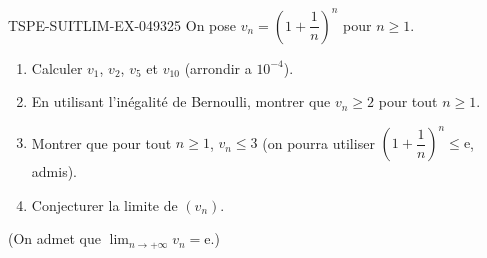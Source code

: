 \begin{exercice}{TSPE-SUITLIM-EX-049}{3}{25}
On pose $v_n = \left(1 + \dfrac{1}{n}\right)^n$ pour $n \geq 1$.
\begin{enumerate}
  \item Calculer $v_1$, $v_2$, $v_5$ et $v_{10}$ (arrondir a $10^{-4}$).
  \item En utilisant l'inégalité de Bernoulli, montrer que $v_n \geq 2$ pour tout $n \geq 1$.
  \item Montrer que pour tout $n \geq 1$, $v_n \leq 3$ (on pourra utiliser $\left(1 + \dfrac{1}{n}\right)^n \leq \mathrm{e}$, admis).
  \item Conjecturer la limite de $(v_n)$.
\end{enumerate}
(On admet que $\lim_{n \to +\infty} v_n = \mathrm{e}$.)
\end{exercice}
